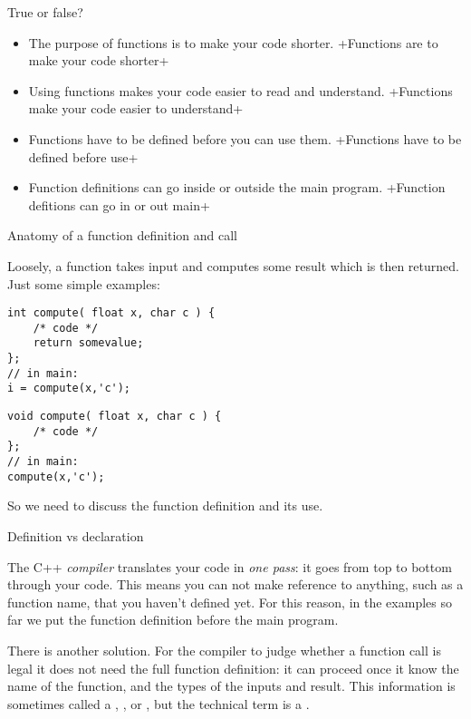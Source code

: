\begin{review}
  \label{rev:func-why}
  True or false?
  \begin{itemize}
  \item The purpose of functions is to make your code shorter.
    \slackpollTF+Functions are to make your code shorter+
  \item Using functions makes your code easier to read and understand.
    \slackpollTF+Functions make your code easier to understand+
  \item Functions have to be defined before you can use them.
    \slackpollTF+Functions have to be defined before use+
  \item Function definitions can go inside or outside the main program.
    \slackpollTF+Function defitions can go in or out main+
  \end{itemize}
\end{review}

 {Anatomy of a function definition and call}

Loosely, a function takes input and computes some result which is then returned.
Just some simple examples:

\begin{multicols}{2}
\begin{lstlisting}
int compute( float x, char c ) {
    /* code */
    return somevalue;
};
// in main:
i = compute(x,'c');
\end{lstlisting}
\columnbreak
\begin{lstlisting}
void compute( float x, char c ) {
    /* code */
};
// in main:
compute(x,'c');
\end{lstlisting}
\end{multicols}

So we need to discuss the function definition and its use.


 {Definition vs declaration}

The C++ \emph{compiler} translates your code in
\emph{one pass}: it goes from top to
bottom through your code. This means you can not make reference to
anything, such as a function name, that you haven't defined yet.
For this reason, in the examples so far we put the function definition
before the main program.

There is another solution.
For the compiler to judge whether a function call is legal
it does not need the full function definition:
it can proceed once it know the name of the function, and the types of
the inputs and result.
This information is sometimes called a
,
,
or ,
but the technical term is a .


